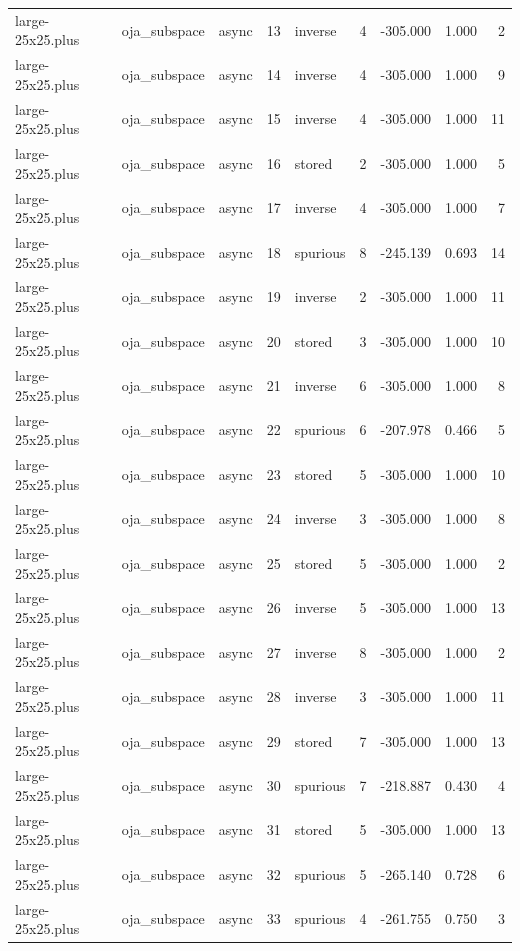 \begin{tabular}{lllrlrrrr}
large-25x25.plus & oja\_subspace & async & 13 & inverse & 4 & -305.000 & 1.000 & 2 \\
large-25x25.plus & oja\_subspace & async & 14 & inverse & 4 & -305.000 & 1.000 & 9 \\
large-25x25.plus & oja\_subspace & async & 15 & inverse & 4 & -305.000 & 1.000 & 11 \\
large-25x25.plus & oja\_subspace & async & 16 & stored & 2 & -305.000 & 1.000 & 5 \\
large-25x25.plus & oja\_subspace & async & 17 & inverse & 4 & -305.000 & 1.000 & 7 \\
large-25x25.plus & oja\_subspace & async & 18 & spurious & 8 & -245.139 & 0.693 & 14 \\
large-25x25.plus & oja\_subspace & async & 19 & inverse & 2 & -305.000 & 1.000 & 11 \\
large-25x25.plus & oja\_subspace & async & 20 & stored & 3 & -305.000 & 1.000 & 10 \\
large-25x25.plus & oja\_subspace & async & 21 & inverse & 6 & -305.000 & 1.000 & 8 \\
large-25x25.plus & oja\_subspace & async & 22 & spurious & 6 & -207.978 & 0.466 & 5 \\
large-25x25.plus & oja\_subspace & async & 23 & stored & 5 & -305.000 & 1.000 & 10 \\
large-25x25.plus & oja\_subspace & async & 24 & inverse & 3 & -305.000 & 1.000 & 8 \\
large-25x25.plus & oja\_subspace & async & 25 & stored & 5 & -305.000 & 1.000 & 2 \\
large-25x25.plus & oja\_subspace & async & 26 & inverse & 5 & -305.000 & 1.000 & 13 \\
large-25x25.plus & oja\_subspace & async & 27 & inverse & 8 & -305.000 & 1.000 & 2 \\
large-25x25.plus & oja\_subspace & async & 28 & inverse & 3 & -305.000 & 1.000 & 11 \\
large-25x25.plus & oja\_subspace & async & 29 & stored & 7 & -305.000 & 1.000 & 13 \\
large-25x25.plus & oja\_subspace & async & 30 & spurious & 7 & -218.887 & 0.430 & 4 \\
large-25x25.plus & oja\_subspace & async & 31 & stored & 5 & -305.000 & 1.000 & 13 \\
large-25x25.plus & oja\_subspace & async & 32 & spurious & 5 & -265.140 & 0.728 & 6 \\
large-25x25.plus & oja\_subspace & async & 33 & spurious & 4 & -261.755 & 0.750 & 3 \\

\end{tabular}
